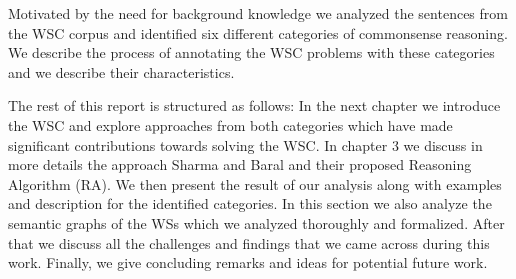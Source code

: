 Motivated by the need for background knowledge we analyzed the sentences from the WSC corpus and identified six different categories of commonsense reasoning. We describe the process of annotating the WSC problems with these categories and we describe their characteristics.

The rest of this report is structured as follows:
In the next chapter we introduce the WSC and explore approaches from both categories which have made significant contributions towards solving the WSC. In chapter 3 we discuss in more details the approach Sharma and Baral \cite{2018CommonsenseKT} and their proposed Reasoning Algorithm (RA).
We then present the result of our analysis along with examples and description for the identified categories. In this section we also analyze the semantic graphs of the WSs which we analyzed thoroughly and formalized. After that we discuss all the challenges and findings that we came across during this work. Finally, we give concluding remarks and ideas for potential future work. 


